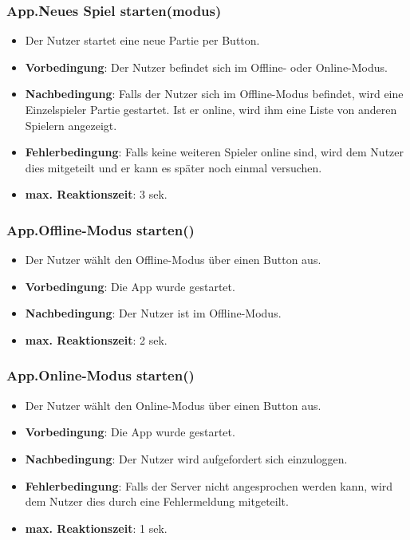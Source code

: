 \documentclass[fontsize=12pt,paper=a4,twoside]{scrartcl}
\begin{document}
\subsubsection{App.Neues Spiel starten(modus)}
\begin{itemize}
\item Der Nutzer startet eine neue Partie per Button.
\item \textbf{Vorbedingung}: Der Nutzer befindet sich im Offline- oder Online-Modus.
\item \textbf{Nachbedingung}: Falls der Nutzer sich im Offline-Modus befindet, wird eine Einzelspieler Partie gestartet. Ist er online, wird ihm eine Liste von anderen Spielern angezeigt.
\item \textbf{Fehlerbedingung}: Falls keine weiteren Spieler online sind, wird dem Nutzer dies mitgeteilt und er kann es später noch einmal versuchen.
\item \textbf{max. Reaktionszeit}: 3 sek.
\end{itemize}

\subsubsection{App.Offline-Modus starten()}
\begin{itemize}
\item Der Nutzer wählt den Offline-Modus über einen Button aus.
\item \textbf{Vorbedingung}: Die App wurde gestartet.
\item \textbf{Nachbedingung}: Der Nutzer ist im Offline-Modus.
\item \textbf{max. Reaktionszeit}: 2 sek.
\end{itemize}

\subsubsection{App.Online-Modus starten()}
\begin{itemize}
\item Der Nutzer wählt den Online-Modus über einen Button aus.
\item \textbf{Vorbedingung}: Die App wurde gestartet.
\item \textbf{Nachbedingung}: Der Nutzer wird aufgefordert sich einzuloggen.
\item \textbf{Fehlerbedingung}: Falls der Server nicht angesprochen werden kann, wird dem Nutzer dies durch eine Fehlermeldung mitgeteilt.
\item \textbf{max. Reaktionszeit}: 1 sek.
\end{itemize}
\end{document}
